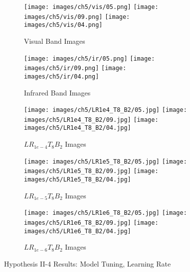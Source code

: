 \begin{figure}[htbp]
    \centering
    \begin{subfigure}[b]{\textwidth}
        \texttt{[image: images/ch5/vis/05.png]}
        \texttt{[image: images/ch5/vis/09.png]}
        \texttt{[image: images/ch5/vis/04.png]}
        \caption{Visual Band Images}
    \end{subfigure}
    \vspace{0.01cm}
    \begin{subfigure}[b]{\textwidth}
        \texttt{[image: images/ch5/ir/05.png]}
        \texttt{[image: images/ch5/ir/09.png]}
        \texttt{[image: images/ch5/ir/04.png]}
        \caption{Infrared Band Images}
    \end{subfigure}
    \vspace{0.01cm}
    \begin{subfigure}[b]{\textwidth}
        \texttt{[image: images/ch5/LR1e4\_T8\_B2/05.jpg]}
        \texttt{[image: images/ch5/LR1e4\_T8\_B2/09.jpg]}
        \texttt{[image: images/ch5/LR1e4\_T8\_B2/04.jpg]}
        \caption{$LR_{1e-4}T_{8}B_{2}$ Images}
    \end{subfigure}
    \vspace{0.01cm}
    \begin{subfigure}[b]{\textwidth}
        \texttt{[image: images/ch5/LR1e5\_T8\_B2/05.jpg]}
        \texttt{[image: images/ch5/LR1e5\_T8\_B2/09.jpg]}
        \texttt{[image: images/ch5/LR1e5\_T8\_B2/04.jpg]}
        \caption{$LR_{1e-5}T_{8}B_{2}$ Images}
    \end{subfigure}
    \vspace{0.01cm}
    \begin{subfigure}[b]{\textwidth}
        \texttt{[image: images/ch5/LR1e6\_T8\_B2/05.jpg]}
        \texttt{[image: images/ch5/LR1e6\_T8\_B2/09.jpg]}
        \texttt{[image: images/ch5/LR1e6\_T8\_B2/04.jpg]}
        \caption{$LR_{1e-6}T_{8}B_{2}$ Images}
    \end{subfigure}
    \vspace{0.01cm}
    \caption{Hypothesis II-4 Results: Model Tuning, Learning Rate }
    \label{fig:ch5:met82}
\end{figure}

